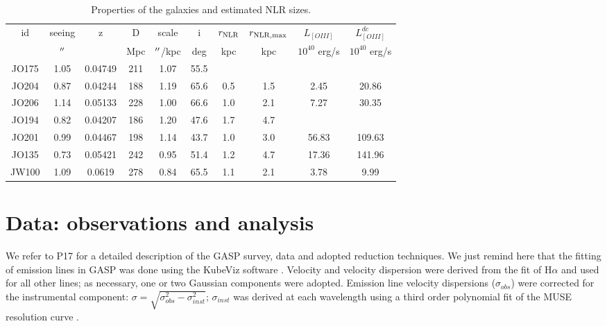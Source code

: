 \documentclass[fleqn,usenatbib]{mnras}
\begin{document}
\begin{table}
	\begin{tabular}{cccccccccc}
		\hline\hline
		id & seeing & z & D & scale & i  & $r_{\rm NLR}$  &  $r_{\rm NLR, max}$  & $L_{[OIII]}$ &$L_{[OIII]}^{dc}$ \\
		& $\hbox{$^{\prime\prime}$}$ & & Mpc & $\hbox{$^{\prime\prime}$}$/kpc & deg & kpc & kpc & $10^{40}$ erg/s &  $10^{40}$ erg/s\\
		\hline
		JO175 & 1.05 & 0.04749& 211  &1.07  & 55.5 &  & \\
		
		JO204 & 0.87 & 0.04244& 188  &1.19  & 65.6 & 0.5& 1.5 & 2.45 & 20.86 \\
		
		JO206 & 1.14 & 0.05133& 228  &1.00  & 66.6 & 1.0 & 2.1 & 7.27 & 30.35\\
		
		JO194 & 0.82 & 0.04207& 186  &1.20  & 47.6 & 1.7 & 4.7 \\
		
		JO201 & 0.99 & 0.04467& 198  &1.14  & 43.7 & 1.0 & 3.0 & 56.83 & 109.63 \\
		
		JO135 & 0.73 & 0.05421& 242  &0.95  & 51.4 & 1.2 & 4.7 & 17.36 & 141.96\\
		
		JW100 & 1.09 & 0.0619& 278  &0.84  & 65.5 & 1.1 & 2.1 & 3.78 & 9.99 \\
		\hline    
	\end{tabular} 
	\caption{Properties of the galaxies and estimated NLR sizes. }
\end{table}

\section{Data: observations and analysis}
\label{sec:Data}


We refer to P17 for a detailed description of the GASP survey,  data and adopted reduction techniques.  We just remind here that the fitting of emission lines in GASP was done  using the KubeViz software \citep{2016MNRAS.455.2028F}. Velocity and velocity dispersion were derived from the fit of H$\alpha$ and used for all other lines; as necessary, one or two Gaussian components were adopted.
Emission line velocity dispersions ($\sigma_{obs}$) were corrected for the instrumental component: $\sigma = \sqrt{\sigma_{obs}^{2}-\sigma_{inst}^{2}}$; $\sigma_{inst}$ was derived at each wavelength using a third order polynomial fit of the MUSE  resolution curve \citep{2014MNRAS.445.4335F}.
\end{document}
